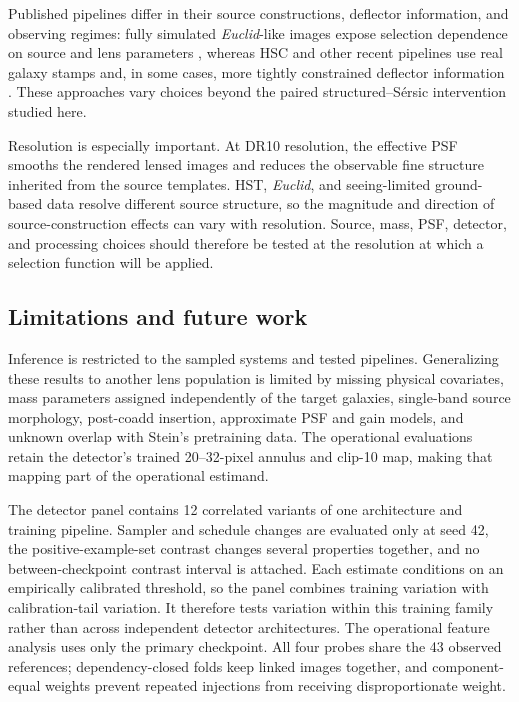 Published pipelines differ in their source constructions, deflector
information, and observing regimes: fully simulated \textit{Euclid}-like
images expose selection dependence on source and lens parameters
\citep{Herle2024}, whereas HSC and other recent pipelines use real galaxy
stamps and, in some cases, more tightly constrained deflector information
\citep{Canameras2021,Rojas2022,Schuldt2023,Canameras2024}. These approaches
vary choices beyond the paired structured--S\'{e}rsic intervention studied
here.

Resolution is especially important. At DR10 resolution, the effective PSF
smooths the rendered lensed images and reduces the observable fine structure
inherited from the source templates. HST, \textit{Euclid}, and seeing-limited
ground-based data resolve different source structure, so the magnitude and
direction of source-construction effects can vary with resolution. Source,
mass, PSF, detector, and processing choices should therefore be tested at the
resolution at which a selection function will be applied.

\subsection{Limitations and future work}
\label{sec:limitations}

Inference is restricted to the sampled systems and tested pipelines.
Generalizing these results to another lens population is limited by missing
physical covariates, mass parameters assigned independently of the target
galaxies, single-band source morphology, post-coadd insertion, approximate PSF
and gain models, and unknown overlap with Stein's pretraining data. The
operational evaluations retain the detector's trained 20--32-pixel annulus and
clip-10 map, making that mapping part of the operational estimand.

The detector panel contains 12 correlated variants of one architecture and
training pipeline. Sampler and schedule changes are
evaluated only at seed 42, the positive-example-set contrast changes several
properties together, and no between-checkpoint contrast interval is attached.
Each estimate conditions on an empirically calibrated threshold, so the panel
combines training variation with calibration-tail variation. It therefore
tests variation within this training family rather than across independent
detector architectures.
The operational feature analysis uses only the primary checkpoint. All four
probes share the 43 observed references; dependency-closed folds keep linked
images together, and component-equal weights prevent repeated injections from
receiving disproportionate weight.

